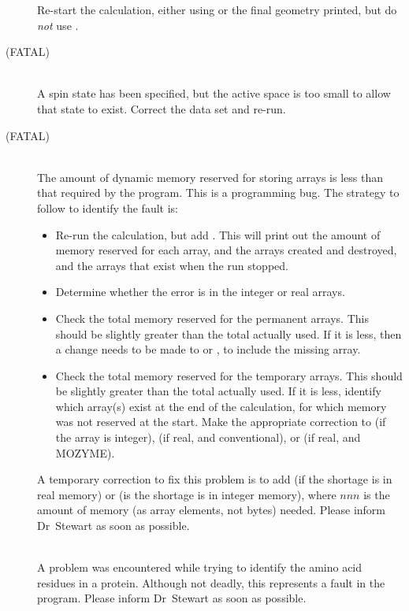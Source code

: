 \begin{description}
Re-start the calculation, either using  or the final geometry
printed, but do {\em not} use .

\item[\comp{SPECIFIED SPIN COMPONENT NOT SPANNED BY ACTIVE SPACE} (FATAL)]~\\
A spin state has been specified, but the active space is too small to
allow that state to exist.  Correct the data set and re-run.
 

\item[\comp{Storage needed for next step: $NNN$} (FATAL)]~\\
The amount of dynamic memory reserved for storing arrays is less than that
required by the program.  This is a programming bug.  The strategy to follow
to identify the fault is:
\begin{itemize}
\item Re-run the calculation, but add .  This will print out the
amount of memory reserved for each array, and the arrays created and destroyed,
and the arrays that exist when the run stopped.
\item Determine whether the error is in the integer or real arrays.
\item  Check the total memory reserved for the permanent arrays.  This should be
slightly greater than the total actually used.  If it is less, then a change
needs to be made to  or , to include the missing
array.
\item Check the total memory reserved for the temporary arrays.  This should be
slightly greater than the total actually used.  If it is less, identify which
array(s) exist at the end of the calculation, for which memory was not reserved
at the start.  Make the appropriate correction to  (if the array
is integer),  (if real, and conventional), or  (if 
real, and MOZYME).
\end{itemize}
A temporary correction to fix this problem is to add  (if the 
shortage is in real memory) or 
 (is the shortage is in integer memory), where $nnn$ is the amount
of memory (as array elements, not bytes) needed.
Please inform Dr~Stewart as soon as possible.

\item[\comp{STRUCTURE UNRECOGNIZABLE}]~\\
A problem was encountered while trying to identify the amino acid residues in 
a protein. Although not deadly, this represents a fault in the program.
Please inform Dr~Stewart as soon as possible.


\end{description}
